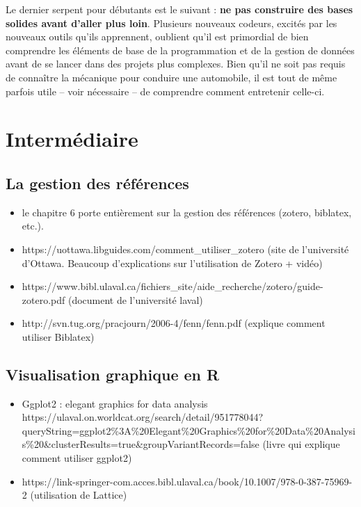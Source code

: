 \documentclass[
  letterpaper,
]{scrbook}
\begin{document}
Le dernier serpent pour débutants est le suivant : \textbf{ne pas
construire des bases solides avant d'aller plus loin}. Plusieurs
nouveaux codeurs, excités par les nouveaux outils qu'ils apprennent,
oublient qu'il est primordial de bien comprendre les éléments de base de
la programmation et de la gestion de données avant de se lancer dans des
projets plus complexes. Bien qu'il ne soit pas requis de connaître la
mécanique pour conduire une automobile, il est tout de même parfois
utile -- voir nécessaire -- de comprendre comment entretenir celle-ci.

\hypertarget{intermuxe9diaire}{%
\section{Intermédiaire}\label{intermuxe9diaire}}

\hypertarget{la-gestion-des-ruxe9fuxe9rences}{%
\subsection{La gestion des
références}\label{la-gestion-des-ruxe9fuxe9rences}}

\begin{itemize}
\item
  le chapitre 6 porte entièrement sur la gestion des références (zotero,
  biblatex, etc.).
\item
  https://uottawa.libguides.com/comment\_utiliser\_zotero (site de
  l'université d'Ottawa. Beaucoup d'explications sur l'utilisation de
  Zotero + vidéo)
\item
  https://www.bibl.ulaval.ca/fichiers\_site/aide\_recherche/zotero/guide-zotero.pdf
  (document de l'université laval)
\item
  http://svn.tug.org/pracjourn/2006-4/fenn/fenn.pdf (explique comment
  utiliser Biblatex)
\end{itemize}

\hypertarget{visualisation-graphique-en-r}{%
\subsection{Visualisation graphique en
R}\label{visualisation-graphique-en-r}}

\begin{itemize}
\item
  Ggplot2 : elegant graphics for data analysis
  https://ulaval.on.worldcat.org/search/detail/951778044?queryString=ggplot2\%3A\%20Elegant\%20Graphics\%20for\%20Data\%20Analysis\%20\&clusterResults=true\&groupVariantRecords=false
  (livre qui explique comment utiliser ggplot2)
\item
  https://link-springer-com.acces.bibl.ulaval.ca/book/10.1007/978-0-387-75969-2
  (utilisation de Lattice)
\end{itemize}
\end{document}
